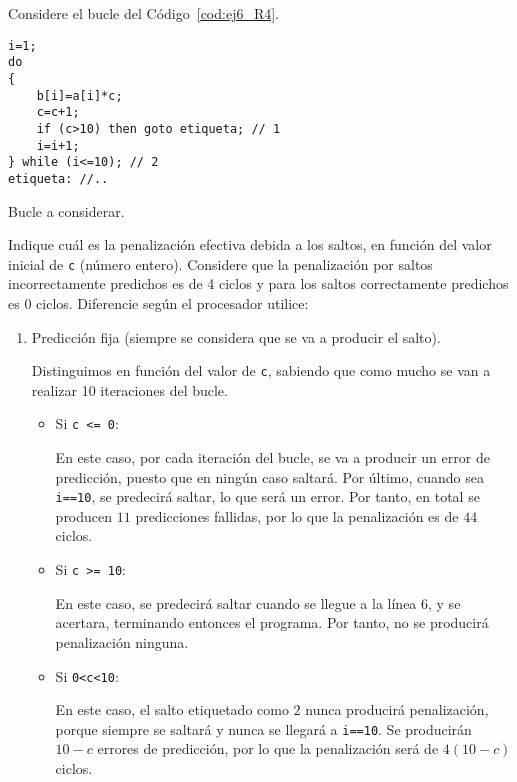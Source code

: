 \begin{ejercicio}\label{ej:6_R4}
    Considere el bucle del Código~\ref{cod:ej6_R4}.
    \begin{listing}[H]
    \begin{verbatim}
i=1;
do
{
    b[i]=a[i]*c;
    c=c+1;
    if (c>10) then goto etiqueta; // 1
    i=i+1;
} while (i<=10); // 2
etiqueta: //..
    \end{verbatim}
    \caption{Bucle a considerar.}
    \label{cod:ej6_R4}
    \end{listing}

Indique cuál es la penalización efectiva debida a los saltos, en función del valor inicial de \verb|c| (número entero). Considere que la penalización por saltos incorrectamente predichos es de 4 ciclos y para los saltos correctamente predichos es 0 ciclos. Diferencie según el procesador utilice:
\begin{enumerate}
    \item Predicción fija (siempre se considera que se va a producir el salto).
    
    Distinguimos en función del valor de \verb|c|, sabiendo que como mucho se van a realizar 10 iteraciones del bucle.
    \begin{itemize}
        \item Si \verb|c <= 0|:
        
        En este caso, por cada iteración del bucle, se va a producir un error de predicción,
        puesto que en ningún caso saltará. Por último, cuando sea \verb|i==10|, se predecirá saltar, lo que será un error. Por tanto,
        en total se producen $11$ predicciones fallidas, por lo que la penalización es de $44$ ciclos.

        \item Si \verb|c >= 10|:
        
        En este caso, se predecirá saltar cuando se llegue a la línea 6, y se acertara, terminando entonces el programa. Por tanto,
        no se producirá penalización ninguna.

        \item Si \verb|0<c<10|:
        
        En este caso, el salto etiquetado como $2$ nunca producirá penalización, porque siempre se saltará y nunca se llegará a \verb|i==10|.
        Se producirán $10-c$ errores de predicción, por lo que la penalización será de $4(10-c)$ ciclos.
    \end{itemize}


\end{enumerate}
\end{ejercicio}
